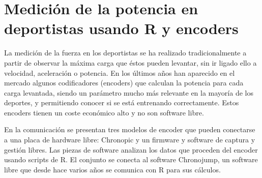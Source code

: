 \chapter{Medición de la potencia en deportistas usando R y encoders}




La medición de la fuerza en los deportistas se ha realizado tradicionalmente a partir de observar la máxima carga que éstos pueden levantar, sin ir ligado ello a velocidad, aceleración o potencia. En los últimos años han aparecido en el mercado algunos codificadores (encoders) que calculan la potencia para cada carga levantada, siendo un parámetro mucho más relevante en la mayoría de los deportes, y permitiendo conocer si se está entrenando correctamente. Estos encoders tienen un coste económico alto y no son software libre.

En la comunicación se presentan tres modelos de encoder que pueden conectarse a una placa de hardware libre: Chronopic y un firmware y software de captura y gestión libres. Las piezas de software analizan los datos que proceden del encoder usando scripts de R. El conjunto se conecta al software Chronojump, un software libre que desde hace varios años se comunica con R para sus cálculos.


%

%
